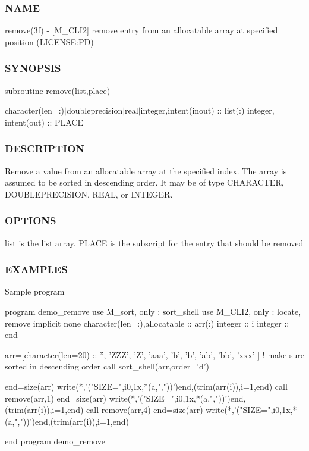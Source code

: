 \subsubsection*{N\+A\+ME}

remove(3f) -\/ \mbox{[}M\+\_\+\+C\+L\+I2\mbox{]} remove entry from an allocatable array at specified position (L\+I\+C\+E\+N\+SE\+:PD) 

\subsubsection*{S\+Y\+N\+O\+P\+S\+IS}

subroutine remove(list,place)

character(len=\+:)$\vert$doubleprecision$\vert$real$\vert$integer,intent(inout) \+:\+: list(\+:) integer, intent(out) \+:\+: P\+L\+A\+CE

\subsubsection*{D\+E\+S\+C\+R\+I\+P\+T\+I\+ON}

\begin{DoxyVerb}Remove a value from an allocatable array at the specified index.
The array is assumed to be sorted in descending order. It may be of
type CHARACTER, DOUBLEPRECISION, REAL, or INTEGER.
\end{DoxyVerb}


\subsubsection*{O\+P\+T\+I\+O\+NS}

\begin{DoxyVerb}list    is the list array.
PLACE   is the subscript for the entry that should be removed
\end{DoxyVerb}


\subsubsection*{E\+X\+A\+M\+P\+L\+ES}

Sample program \begin{DoxyVerb}program demo_remove
use M_sort, only : sort_shell
use M_CLI2, only : locate, remove
implicit none
character(len=:),allocatable :: arr(:)
integer                       :: i
integer                       :: end

arr=[character(len=20) :: '', 'ZZZ', 'Z', 'aaa', 'b', 'b', 'ab', 'bb', 'xxx' ]
! make sure sorted in descending order
call sort_shell(arr,order='d')

end=size(arr)
write(*,'("SIZE=",i0,1x,*(a,","))')end,(trim(arr(i)),i=1,end)
call remove(arr,1)
end=size(arr)
write(*,'("SIZE=",i0,1x,*(a,","))')end,(trim(arr(i)),i=1,end)
call remove(arr,4)
end=size(arr)
write(*,'("SIZE=",i0,1x,*(a,","))')end,(trim(arr(i)),i=1,end)

end program demo_remove
\end{DoxyVerb}


